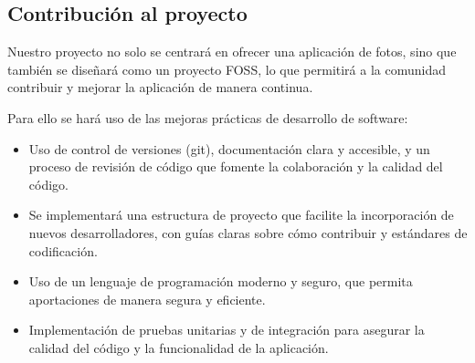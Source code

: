 \subsection{Contribución al proyecto}
Nuestro proyecto no solo se centrará en ofrecer una aplicación de fotos, sino que también se diseñará como un proyecto FOSS, lo que permitirá a la comunidad contribuir y mejorar la aplicación de manera continua.

Para ello se hará uso de las mejoras prácticas de desarrollo de software:
\begin{itemize}
    \item Uso de control de versiones (\Gls{git}), documentación clara y accesible, y un proceso de revisión de código que fomente la colaboración y la calidad del código.
    \item Se implementará una estructura de proyecto que facilite la incorporación de nuevos desarrolladores, con guías claras sobre cómo contribuir y estándares de codificación.
    \item Uso de un lenguaje de programación moderno y seguro, que permita aportaciones de manera segura y eficiente.
    \item Implementación de pruebas unitarias y de integración para asegurar la calidad del código y la funcionalidad de la aplicación.
\end{itemize}
